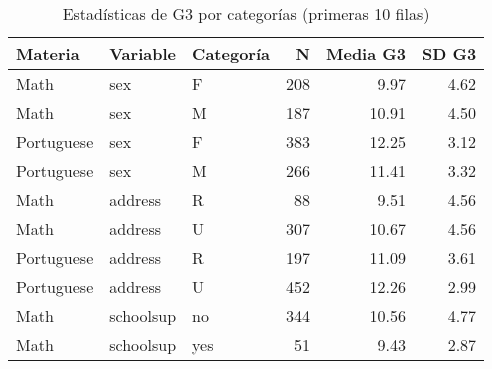 \documentclass[
]{book}
\begin{document}
\begin{table}

\caption{\label{tab:categorical-analysis}Estadísticas de G3 por categorías (primeras 10 filas)}
\centering
\begin{tabular}[t]{l|l|l|r|r|r}
\hline
Materia & Variable & Categoría & N & Media G3 & SD G3\\
\hline
Math & sex & F & 208 & 9.97 & 4.62\\
\hline
Math & sex & M & 187 & 10.91 & 4.50\\
\hline
Portuguese & sex & F & 383 & 12.25 & 3.12\\
\hline
Portuguese & sex & M & 266 & 11.41 & 3.32\\
\hline
Math & address & R & 88 & 9.51 & 4.56\\
\hline
Math & address & U & 307 & 10.67 & 4.56\\
\hline
Portuguese & address & R & 197 & 11.09 & 3.61\\
\hline
Portuguese & address & U & 452 & 12.26 & 2.99\\
\hline
Math & schoolsup & no & 344 & 10.56 & 4.77\\
\hline
Math & schoolsup & yes & 51 & 9.43 & 2.87\\
\hline
\end{tabular}
\end{table}
\end{document}
